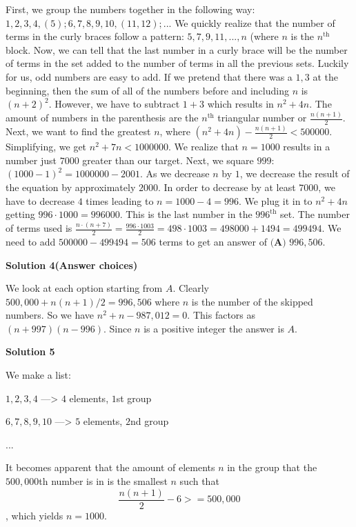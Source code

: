 \begin{enumerate}
First, we group the numbers together in the following way: ${1, 2, 3, 4, (5)}; {6, 7, 8, 9, 10, (11, 12)}; ...$ We quickly realize that the number of terms in the curly braces follow a pattern: $5, 7, 9, 11, ... , n$ (where $n$ is the $n^\text{th}$ block. Now, we can tell that the last number in a curly brace will be the number of terms in the set added to the number of terms in all the previous sets. Luckily for us, odd numbers are easy to add. If we pretend that there was a $1, 3$ at the beginning, then the sum of all of the numbers before and including $n$ is $(n+2)^2$. However, we have to subtract $1+3$ which results in $n^2+4n$. The amount of numbers in the parenthesis are the $n^\text{th}$ triangular number or $\frac{n(n+1)}{2}$. Next, we want to find the greatest $n$, where $(n^2+4n) - \frac{n(n+1)}{2}<500000$. Simplifying, we get $n^2+7n<1000000$. We realize that $n=1000$ results in a number just $7000$ greater than our target. Next, we square $999$: $(1000 - 1)^2 = 1000000 - 2001$. As we decrease $n$ by $1$, we decrease the result of the equation by approximately $2000$. In order to decrease by at least $7000$, we have to decrease $4$ times leading to $n=1000-4=996$. We plug it in to $n^2+4n$ getting $996\cdot1000=996000$. This is the last number in the $996^\text{th}$ set. The number of terms used is $\frac{n\cdot(n+7)}{2}=\frac{996\cdot1003}{2}=498\cdot1003=498000+1494=499494$. We need to add $500000-499494=506$ terms to get an answer of $\boxed{\textbf{(A) }996,506}$.

 



\textbf{Solution 4(Answer choices)}

We look at each option starting from $A$. Clearly $500,000 + n(n+1)/2 = 996,506$ where $n$ is the number of the skipped numbers. So we have $n^2 + n - 987,012 = 0$. This factors as $(n+997)(n-996)$. Since $n$ is a positive integer the answer is $A$. 

 



\textbf{Solution 5}

We make a list:

 $1,2,3,4$ ---> $4$ elements, $1$st group

 $6,7,8,9,10$ ---> $5$ elements, $2$nd group

 ...

 It becomes apparent that the amount of elements $n$ in the group that the $500,000$th number is in is the smallest $n$ such that 
 \[\frac{n(n+1)}{2} - 6 >= 500,000\], which yields $n=1000$.


\end{enumerate}
